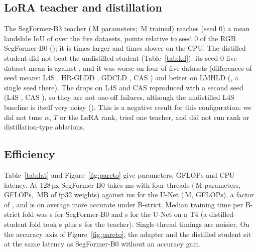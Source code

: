 \documentclass[11pt]{article}
\newcommand{\iou}{IoU}
\begin{document}
\subsection{LoRA teacher and distillation}\label{sec:kd}
The SegFormer-B3 teacher (\TeachParamsM{}\,M parameters; \TeachTrainableM{}\,M trained) reaches (seed 0) a mean landslide \iou{} of \TeachIouAllZ{} over the five datasets, \TeachMinusSegZ{} points relative to seed 0 of the RGB SegFormer-B0 (\SegIouAllZ{}); it is \ParamRatioTeachSeg{} times larger and \LatRatioTeachSeg{} times slower on the CPU. The distilled student did not beat the undistilled student (Table~\ref{tab:kd}): its seed-0 five-dataset mean is \KdIouAllZ{} against \SegIouAllZ{}, and it was worse on four of five datasets (differences of seed means: L4S \DiffKdSegLfs{}, HR-GLDD \DiffKdSegHrg{}, GDCLD \DiffKdSegGdc{}, CAS \DiffKdSegCas{}) and better on LMHLD (\DiffKdSegLmh{}, a single seed there). The drops on L4S and CAS reproduced with a second seed (L4S \KdIouLfsP{}, CAS \KdIouCasP{}), so they are not one-off failures, although the undistilled L4S baseline is itself very noisy (\SegIouLfsP{}). This is a negative result for this configuration: we did not tune $\alpha$, $T$ or the LoRA rank, tried one teacher, and did not run rank or distillation-type ablations.

\begin{table}[t]\centering\small
\resizebox{\textwidth}{!}{}
\caption{Teacher and distilled student, B-strict landslide \iou{} (\%). $^\dagger$ single seed; $^\ddagger$ two seeds. The teacher was trained once per fold (seed 0).}\label{tab:kd}
\end{table}

\subsection{Efficiency}\label{sec:eff}
Table~\ref{tab:lat} and Figure~\ref{fig:pareto} give parameters, GFLOPs and CPU latency. At 128\,px SegFormer-B0 takes \LatSegPxOneTwoEightTFour{} ms with four threads (\ParSeg{}\,M parameters, \GflSegPxOneTwoEight{} GFLOPs, \MbSeg{}\,MB of fp32 weights) against \LatUnetPxOneTwoEightTFour{} ms for the U-Net (\ParUnet{}\,M, \GflUnetPxOneTwoEight{} GFLOPs), a factor of \LatRatioUnetSeg{}, and is on average more accurate under B-strict. Median training time per B-strict fold was \TimeSegMedS{} s for SegFormer-B0 and \TimeUnetMedS{} s for the U-Net on a T4 (a distilled-student fold took \TimeKdMedS{} s plus \TeachMedTrainS{} s for the teacher). Single-thread timings are noisier. On the accuracy axis of Figure~\ref{fig:pareto}, the adapter and the distilled student sit at the same latency as SegFormer-B0 without an accuracy gain.
\end{document}
